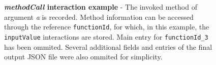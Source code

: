 \begin{figure}[h]
	\centering
	\begin{lrbox}{\mintedbox}
		\begin{minipage}{0.4\textwidth}
		\end{minipage}
	\end{lrbox}
	\hfill
	\begin{lrbox}{\mintedbox}
		\begin{minipage}{0.58\textwidth}
		\end{minipage}
	\end{lrbox}
	\caption[\textit{methodCall} interaction example]{\textbf{\textit{methodCall} interaction example} - The invoked method of argument \textit{a} is recorded. Method information can be accessed through the reference \texttt{functionId}, for which, in this example, the \texttt{inputValue} interactions are stored. Main entry for \texttt{functionId_3} has been ommited. Several additional fields and entries of the final output JSON file were also ommited for simplicity.}
	\label{fig:run-time-information-gathering-method-call}
\end{figure}